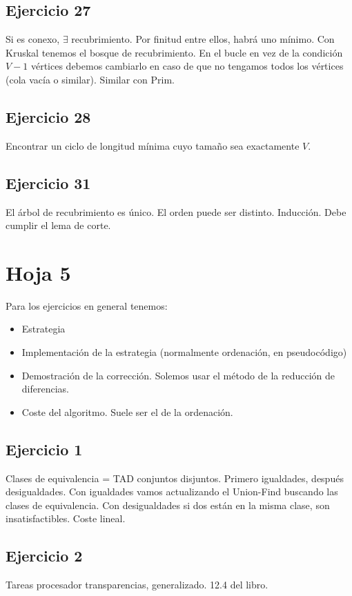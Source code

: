 \documentclass[10pt,a4paper,openright]{book}
\theoremstyle{break}
\begin{document}
\section{Ejercicio 27}%
\label{sec:ejercicio_27_4}
Si es conexo, $\exists$ recubrimiento. Por finitud entre ellos, habrá uno mínimo. Con Kruskal tenemos el bosque de recubrimiento. En el bucle en vez de la condición $V - 1$ vértices debemos cambiarlo en caso de que no tengamos todos los vértices (cola vacía o similar). Similar con Prim. 

\section{Ejercicio 28}%
\label{sec:ejercicio_28_4}
Encontrar un ciclo de longitud  mínima cuyo tamaño sea exactamente $V$.

\section{Ejercicio 31}%
\label{sec:ejercicio_31_4}
El árbol de recubrimiento es único. El orden puede ser distinto. Inducción. Debe cumplir el lema de corte.

\chapter{Hoja 5}%
\label{cha:hoja_5}
Para los ejercicios en general tenemos:
\begin{itemize}
    \item Estrategia
    \item Implementación de la estrategia (normalmente ordenación, en pseudocódigo)
    \item Demostración de la corrección. Solemos usar el método de la reducción de diferencias.
    \item Coste del algoritmo. Suele ser el de la ordenación.
\end{itemize}

\section{Ejercicio 1}%
\label{sec:ejercicio_1_5}
Clases de equivalencia = TAD conjuntos disjuntos. Primero igualdades, después desigualdades. Con igualdades vamos actualizando el Union-Find buscando las clases de equivalencia. Con desigualdades si dos están en la misma clase, son insatisfactibles. Coste lineal.

\section{Ejercicio 2}%
\label{sec:ejercicio_2_5}
Tareas procesador transparencias, generalizado. 12.4 del libro.
\end{document}
